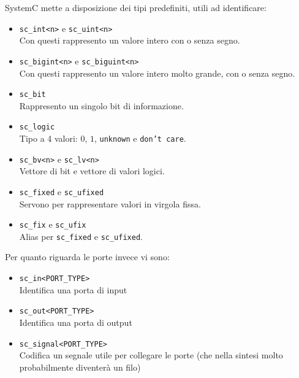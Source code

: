 \documentclass[10pt,a4paper,oneside]{scrbook}
\begin{document}
SystemC mette a disposizione dei tipi predefiniti, utili ad identificare: 
\begin{itemize}
    \item \texttt{sc\_int<n>} e \texttt{sc\_uint<n>}\\
    Con questi rappresento un valore intero con o senza segno.
    \item \texttt{sc\_bigint<n>} e \texttt{sc\_biguint<n>}\\
    Con questi rappresento un valore intero molto grande, con o senza segno.
    \item \texttt{sc\_bit}\\
    Rappresento un singolo bit di informazione.
    \item \texttt{sc\_logic}\\
    Tipo a 4 valori: $0$, $1$, \texttt{unknown} e \texttt{don't care}.
    \item \texttt{sc\_bv<n>} e \texttt{sc\_lv<n>}\\
    Vettore di bit e vettore di valori logici.
    \item \texttt{sc\_fixed} e \texttt{sc\_ufixed}\\
    Servono per rappresentare valori in virgola fissa.
    \item \texttt{sc\_fix} e \texttt{sc\_ufix}\\
    Alias per \texttt{sc\_fixed} e \texttt{sc\_ufixed}.
\end{itemize}
Per quanto riguarda le porte invece vi sono:
\begin{itemize}
    \item \texttt{sc\_in<PORT\_TYPE>}\\
    Identifica una porta di input
    \item \texttt{sc\_out<PORT\_TYPE>}\\
    Identifica una porta di output
    \item \texttt{sc\_signal<PORT\_TYPE>}\\
    Codifica un segnale utile per collegare le porte (che nella sintesi molto probabilmente diventerà un filo)
\end{itemize}
\end{document}
